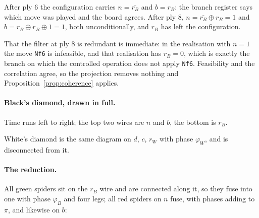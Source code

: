 \documentclass[11pt,a4paper]{article}
\theoremstyle{definition}
\theoremstyle{plain}
\begin{document}
After ply 6 the configuration carries $n=\overline{r_B}$ and $b=r_B$: the branch
register says which move was played and the board agrees. After ply 8,
$n = \overline{r_B}\oplus r_B = 1$ and $b = r_B\oplus r_B\oplus 1 = 1$, both
unconditionally, and $r_B$ has left the configuration.

That the filter at ply 8 is redundant is immediate: in the realisation with
$n=1$ the move \texttt{Nf6} is infeasible, and that realisation has $r_B=0$,
which is exactly the branch on which the controlled operation does not apply
\texttt{Nf6}. Feasibility and the correlation agree, so the projection removes
nothing and Proposition~\ref{prop:coherence} applies.

\paragraph{Black's diamond, drawn in full.}
Time runs left to right; the top two wires are $n$ and $b$, the bottom is $r_B$.

\begin{center}
\end{center}

White's diamond is the same diagram on $d$, $c$, $r_W$ with phase $\varphi_W$,
and is disconnected from it.

\paragraph{The reduction.}
All green spiders sit on the $r_B$ wire and are connected along it, so they fuse
into one with phase $\varphi_B$ and four legs; all red spiders on $n$ fuse, with
phases adding to $\pi$, and likewise on $b$:
\end{document}
